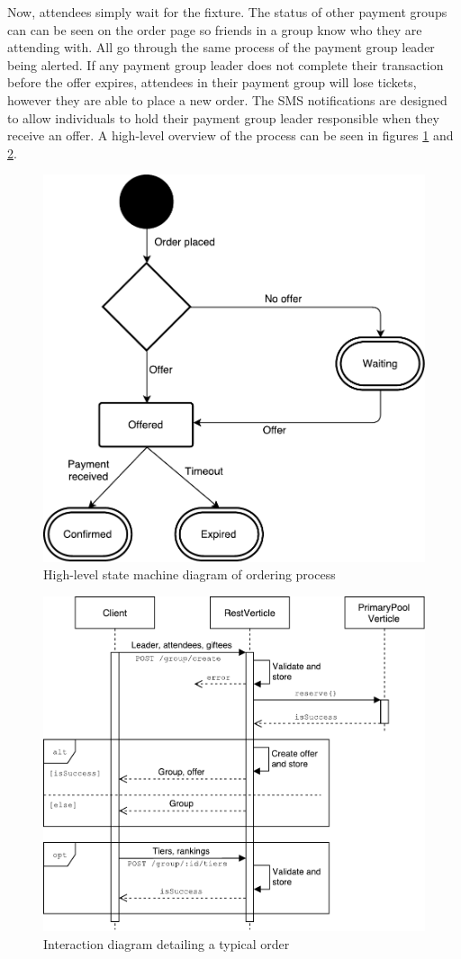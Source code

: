 \documentclass[12pt,a4paper]{bhamdissertation}
\begin{document}
Now, attendees simply wait for the fixture. The status of other payment groups can can be seen on the order page so friends in a group know who they are attending with. All go through the same process of the payment group leader being alerted. If any payment group leader does not complete their transaction before the offer expires, attendees in their payment group will lose tickets, however they are able to place a new order. The SMS notifications are designed to allow individuals to hold their payment group leader responsible when they receive an offer. A high-level overview of the process can be seen in figures \ref{img:order_state_diagram} and  \ref{img:order_interaction}.

\begin{figure}[!htbp]
    \centering
    \includegraphics[width=0.8\linewidth]{img/order_state_diagram.pdf}
    \caption{High-level state machine diagram of ordering process}
    \label{img:order_state_diagram}
\end{figure}

\begin{figure}[!htbp]
    \centering
    \includegraphics[width=0.8\linewidth]{img/order_interaction.pdf}
    \caption{Interaction diagram detailing a typical order}
    \label{img:order_interaction}
\end{figure}
\end{document}
